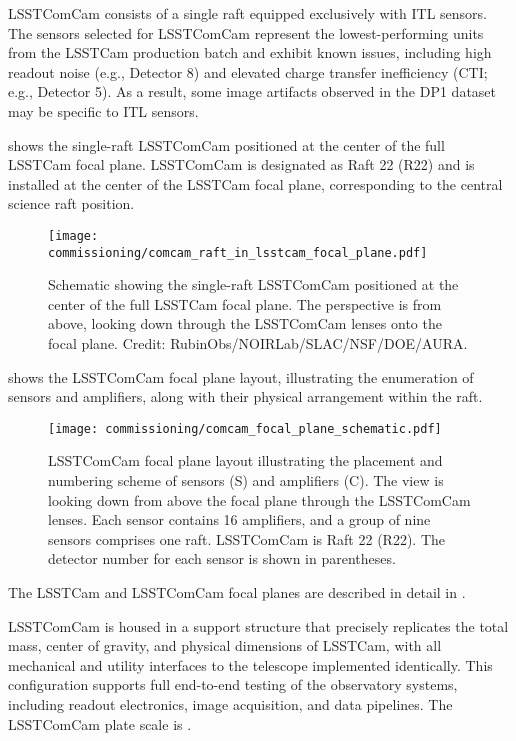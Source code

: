 LSSTComCam consists of a single raft equipped exclusively with ITL sensors.
The sensors selected for LSSTComCam represent the lowest-performing units from the LSSTCam production batch and exhibit known issues, including high readout noise (e.g., Detector 8) and elevated charge transfer inefficiency (CTI; e.g., Detector 5).
As a result, some image artifacts observed in the DP1 dataset may be specific to ITL sensors.

 shows the single-raft LSSTComCam positioned at the center of the full LSSTCam focal plane. 
LSSTComCam is designated as Raft 22 (R22) and is installed at the center of the LSSTCam focal plane, corresponding to the central science raft position.
\begin{figure}[htb]
\centering
\texttt{[image: commissioning/comcam\_raft\_in\_lsstcam\_focal\_plane.pdf]}
\caption{Schematic showing the single-raft LSSTComCam positioned at the center of the full LSSTCam focal plane. The perspective is from above, looking down through the LSSTComCam lenses onto the focal plane. Credit: RubinObs/NOIRLab/SLAC/NSF/DOE/AURA.}
\label{fig:comcam_raft_in_lsstcam_focal_plane}
\vspace{0.1cm}
\end{figure}

 shows the LSSTComCam focal plane layout, illustrating the enumeration of sensors and amplifiers, along with their physical arrangement within the raft.
\begin{figure}[htb!]
\centering
\texttt{[image: commissioning/comcam\_focal\_plane\_schematic.pdf]}
\caption{LSSTComCam focal plane layout illustrating the placement and numbering scheme of sensors (S) and amplifiers (C). The view is looking down from above the focal plane through the LSSTComCam lenses. Each sensor contains 16 amplifiers, and a group of nine sensors comprises one raft. LSSTComCam is Raft 22 (R22). The detector number for each sensor is shown in parentheses.}
\label{fig:comcam_focal_plane}
\vspace{0.1cm}
\end{figure}
The LSSTCam and LSSTComCam focal planes are described in detail in \cite{ctn001}.

LSSTComCam is housed in a support structure that precisely replicates the total mass, center of gravity, and physical dimensions of LSSTCam, with all mechanical and utility interfaces to the telescope implemented identically. 
This configuration supports full end-to-end testing of the observatory systems, including readout electronics, image acquisition, and data pipelines.
The LSSTComCam plate scale is \rawplatescale. 


